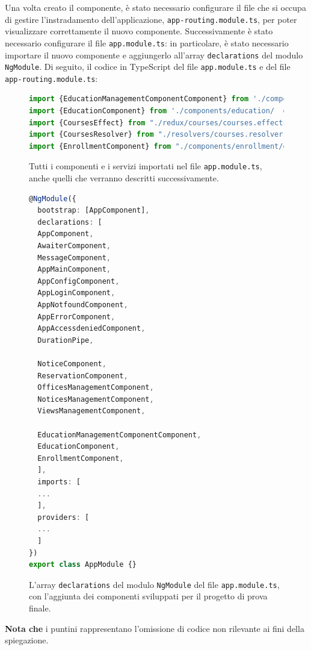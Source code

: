 Una volta creato il componente, è stato necessario configurare il file che si occupa di gestire l'instradamento dell'applicazione, \texttt{app-routing.module.ts}, per poter visualizzare correttamente il nuovo componente. Successivamente è stato necessario configurare il file \texttt{app.module.ts}: in particolare, è stato necessario importare il nuovo componente e aggiungerlo all'array \texttt{declarations} del modulo \texttt{NgModule}. Di seguito, il codice in TypeScript del file \texttt{app.module.ts} e del file \texttt{app-routing.module.ts}:
\begin{figure}[H]
\centering
\begin{lstlisting}[language=TypeScript, linewidth=20cm, basicstyle=\tiny]
import {EducationManagementComponentComponent} from './components/admin/educationManagementComponent/ educationManagementComponent.component';
import {EducationComponent} from './components/education/  education.component';
import {CoursesEffect} from "./redux/courses/courses.effects";
import {CoursesResolver} from "./resolvers/courses.resolver";
import {EnrollmentComponent} from "./components/enrollment/enrollment.component";
\end{lstlisting}
\caption{\label{fig:app.module import}Tutti i componenti e i servizi importati nel file \texttt{app.module.ts}, anche quelli che verranno descritti successivamente.}
\end{figure}

\begin{figure}[H]
\centering
\begin{lstlisting}[language=TypeScript, linewidth=20cm, basicstyle=\tiny]
@NgModule({
  bootstrap: [AppComponent],
  declarations: [
  AppComponent,
  AwaiterComponent,
  MessageComponent,
  AppMainComponent,
  AppConfigComponent,
  AppLoginComponent,
  AppNotfoundComponent,
  AppErrorComponent,
  AppAccessdeniedComponent,
  DurationPipe,

  NoticeComponent,
  ReservationComponent,
  OfficesManagementComponent,
  NoticesManagementComponent,
  ViewsManagementComponent,

  EducationManagementComponentComponent,
  EducationComponent,
  EnrollmentComponent,
  ],
  imports: [
  ...
  ],
  providers: [
  ...
  ]
})
export class AppModule {}
\end{lstlisting}
\caption{\label{fig:app.module ngmodule}L'array \texttt{declarations} del modulo \texttt{NgModule} del file \texttt{app.module.ts}, con l'aggiunta dei componenti sviluppati per il progetto di prova finale.}
\end{figure}
\textbf{Nota che } i puntini rappresentano l'omissione di codice non rilevante ai fini della spiegazione.\newline

